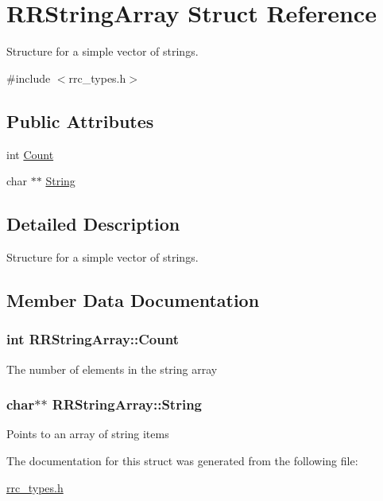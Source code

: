 \hypertarget{struct_r_r_string_array}{}\section{R\+R\+String\+Array Struct Reference}
\label{struct_r_r_string_array}


Structure for a simple vector of strings.  




{\ttfamily \#include $<$rrc\+\_\+types.\+h$>$}

\subsection*{Public Attributes}
\begin{DoxyCompactItemize}
\item 
int \hyperlink{struct_r_r_string_array_ac36cf70dc7a2832c24c5dec622fec2fb}{Count}
\item 
char $\ast$$\ast$ \hyperlink{struct_r_r_string_array_a848b81ad8aeeb26b39411c462aab1312}{String}
\end{DoxyCompactItemize}


\subsection{Detailed Description}
Structure for a simple vector of strings. 

\subsection{Member Data Documentation}
\hypertarget{struct_r_r_string_array_ac36cf70dc7a2832c24c5dec622fec2fb}{}
\subsubsection[{Count}]{\setlength{\rightskip}{0pt plus 5cm}int R\+R\+String\+Array\+::\+Count}\label{struct_r_r_string_array_ac36cf70dc7a2832c24c5dec622fec2fb}
The number of elements in the string array \hypertarget{struct_r_r_string_array_a848b81ad8aeeb26b39411c462aab1312}{}
\subsubsection[{String}]{\setlength{\rightskip}{0pt plus 5cm}char$\ast$$\ast$ R\+R\+String\+Array\+::\+String}\label{struct_r_r_string_array_a848b81ad8aeeb26b39411c462aab1312}
Points to an array of string items 

The documentation for this struct was generated from the following file\+:\begin{DoxyCompactItemize}
\item 
\hyperlink{rrc__types_8h}{rrc\+\_\+types.\+h}\end{DoxyCompactItemize}

